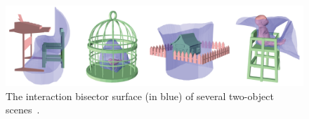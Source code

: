 
\begin{figure}[t] \centering
    \includegraphics[width=0.99\linewidth]{fig/img/zhao_tog14_ibs}
    \caption{
    The interaction bisector surface (in blue) of several two-object scenes~\cite{Zhao:2014:ISU}.
    }
    \label{fig:zhao_tog14_ibs}
\end{figure}
